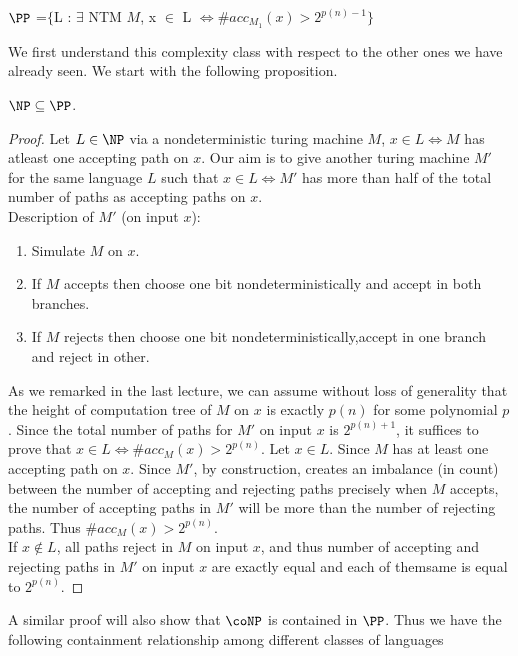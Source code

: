 \documentclass{report}
\begin{document}
\begin{definition}
$\PP$ =$\{$L : $\exists$ NTM $M$, x $\in$ L $\iff \#acc_{M_1}(x) > 2^{p(n)-1} \}$
\end{definition}

We first understand this complexity class with respect to the other ones we have already seen. We start with the following proposition.

\begin{proposition}
\label{prop}
$\NP \subseteq \PP$.
\end{proposition}
\begin{proof}
Let $L \in \NP$  via a nondeterministic turing machine $M$,  $ x \in L \iff M$ has atleast one accepting path on $x$. 
Our aim is to give another turing machine $M'$ for the same language $L$ such that
$x \in L \iff M'$ has more than half of the total number of paths as accepting paths on $x$.\\
Description of $M'$ (on input $x$):
\begin{enumerate}
\item Simulate $M$ on $x$.
\item If $M$ accepts then choose one bit nondeterministically and accept in both branches.
\item If $M$ rejects then choose one bit nondeterministically,accept in one branch and reject in other.
\end{enumerate}

As we remarked in the last lecture, we can assume without loss of generality that the height of computation tree of $M$ on $x$ is exactly $p(n)$ for some polynomial $p$. Since the total number of paths for $M'$ on input $x$ is $2^{p(n)+1}$, it suffices to prove that $x \in L \iff \#acc_M(x) > 2^{p(n)}$.
Let $x \in L$. Since $M$ has at least one accepting path on $x$. Since $M'$, by construction, creates an imbalance (in count) between the number of accepting and rejecting paths precisely when $M$ accepts,  the number of accepting paths in $M'$ will be more than the number of rejecting paths. Thus $\#acc_M(x) > 2^{p(n)}$. \\
If  $x \not\in L$, all paths reject in $M$ on input $x$, and thus  number of accepting and rejecting
paths in $M'$ on input $x$ are exactly equal and each of themsame is equal to $2^{p(n)}$.
\end{proof}

A similar proof will also show that $\coNP$ is contained in
$\PP$. Thus we have the following containment relationship among
different classes of languages
 
\end{document}
